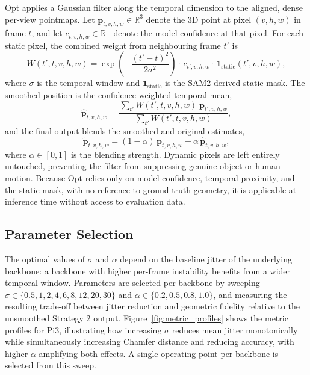 Opt applies a Gaussian filter along the temporal dimension to the aligned, dense per-view
pointmaps. Let $\mathbf{p}_{t,v,h,w} \in \mathbb{R}^3$ denote the 3D point at pixel
$(v, h, w)$ in frame $t$, and let $c_{t,v,h,w} \in \mathbb{R}^+$ denote the model
confidence at that pixel. For each static pixel, the combined weight from neighbouring
frame $t'$ is
\begin{equation}
    W(t', t, v, h, w) = \exp\!\left(-\frac{(t' - t)^2}{2\sigma^2}\right)
    \cdot\, c_{t',v,h,w}
    \cdot\, \mathbf{1}_{\mathrm{static}}(t', v, h, w),
\end{equation}
where $\sigma$ is the temporal window and $\mathbf{1}_{\mathrm{static}}$ is the SAM2-derived
static mask. The smoothed position is the confidence-weighted temporal mean,
\begin{equation}
    \hat{\mathbf{p}}_{t,v,h,w}
    = \frac{\displaystyle\sum_{t'} W(t', t, v, h, w)\;\mathbf{p}_{t',v,h,w}}
           {\displaystyle\sum_{t'} W(t', t, v, h, w)},
\end{equation}
and the final output blends the smoothed and original estimates,
\begin{equation}
    \tilde{\mathbf{p}}_{t,v,h,w}
    = (1 - \alpha)\,\mathbf{p}_{t,v,h,w}
    + \alpha\,\hat{\mathbf{p}}_{t,v,h,w},
\end{equation}
where $\alpha \in [0, 1]$ is the blending strength. Dynamic pixels are left entirely
untouched, preventing the filter from suppressing genuine object or human motion. Because
Opt relies only on model confidence, temporal proximity, and the static mask, with no
reference to ground-truth geometry, it is applicable at inference time without access to
evaluation data.

\subsection{Parameter Selection}
\label{sec:opt_parameters}

The optimal values of $\sigma$ and $\alpha$ depend on the baseline jitter of the
underlying backbone: a backbone with higher per-frame instability benefits from a
wider temporal window. Parameters are selected per backbone by sweeping
$\sigma \in \{0.5, 1, 2, 4, 6, 8, 12, 20, 30\}$ and
$\alpha \in \{0.2, 0.5, 0.8, 1.0\}$, and measuring the resulting trade-off
between jitter reduction and geometric fidelity relative to the unsmoothed
Strategy 2 output. Figure~\ref{fig:metric_profiles} shows the metric profiles
for Pi3, illustrating how increasing $\sigma$ reduces mean jitter monotonically
while simultaneously increasing Chamfer distance and reducing accuracy, with
higher $\alpha$ amplifying both effects. A single operating point per backbone
is selected from this sweep.

